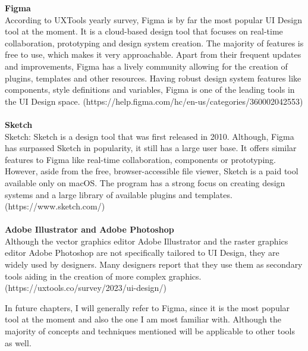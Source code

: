 \textbf{Figma}\\
According to UXTools yearly survey, Figma is by far the most popular UI Design tool at the moment.
 It is a cloud-based design tool that focuses on real-time
collaboration, prototyping and design system creation. The majority of features is free to use,
which makes it very approachable. Apart from their frequent updates and improvements, Figma has a
lively community allowing for the creation of plugins, templates and other resources. Having robust
design system features like components, style definitions and variables, Figma is one of the leading
tools in the UI Design space. (https://help.figma.com/hc/en-us/categories/360002042553)\\\\
\textbf{Sketch}\\
Sketch: Sketch is a design tool that was first released in 2010. Although, Figma has surpassed
Sketch in popularity, it still has a large user base. It offers similar features to Figma like
real-time collaboration, components or prototyping. However, aside from the free, browser-accessible
file viewer, Sketch is a paid tool available only on macOS. The program has a strong focus on
creating design systems and a large library of available plugins and templates.
(https://www.sketch.com/)\\\\
\textbf{Adobe Illustrator and Adobe Photoshop}\\
Although the vector graphics editor Adobe Illustrator and the raster graphics editor Adobe Photoshop
are not specifically tailored to UI Design, they are widely used by designers. Many designers report
that they use them as secondary tools aiding in the creation of more complex graphics. (https://uxtools.co/survey/2023/ui-design/)

In future chapters, I will generally refer to Figma, since it is the most popular tool at the moment
and also the one I am most familiar with. Although the majority of concepts and techniques mentioned
will be applicable to other tools as well.
